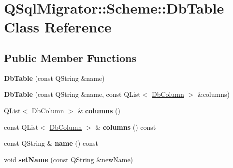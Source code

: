 \hypertarget{class_q_sql_migrator_1_1_scheme_1_1_db_table}{}\section{Q\+Sql\+Migrator\+:\+:Scheme\+:\+:Db\+Table Class Reference}
\label{class_q_sql_migrator_1_1_scheme_1_1_db_table}
\subsection*{Public Member Functions}
\begin{DoxyCompactItemize}
\item 
\mbox{\label{class_q_sql_migrator_1_1_scheme_1_1_db_table_aafe7fd03a4bd5ae26f578927b56d9baf}} 
{\bfseries Db\+Table} (const Q\+String \&name)
\item 
\mbox{\label{class_q_sql_migrator_1_1_scheme_1_1_db_table_a01333e5564fc51ab01d0817165cb6cd2}} 
{\bfseries Db\+Table} (const Q\+String \&name, const Q\+List$<$ \hyperlink{class_q_sql_migrator_1_1_scheme_1_1_db_column}{Db\+Column} $>$ \&columns)
\item 
\mbox{\label{class_q_sql_migrator_1_1_scheme_1_1_db_table_af5fc51b2a8ad10d03fb03f8a91efca5c}} 
Q\+List$<$ \hyperlink{class_q_sql_migrator_1_1_scheme_1_1_db_column}{Db\+Column} $>$ \& {\bfseries columns} ()
\item 
\mbox{\label{class_q_sql_migrator_1_1_scheme_1_1_db_table_a219b3cb406a48703456d3f7795ba8e6c}} 
const Q\+List$<$ \hyperlink{class_q_sql_migrator_1_1_scheme_1_1_db_column}{Db\+Column} $>$ \& {\bfseries columns} () const
\item 
\mbox{\label{class_q_sql_migrator_1_1_scheme_1_1_db_table_ac8a58d078563ba566d8762106564358f}} 
const Q\+String \& {\bfseries name} () const
\item 
\mbox{\label{class_q_sql_migrator_1_1_scheme_1_1_db_table_a1a6846104fb0038b6ab6c648f620c1d1}} 
void {\bfseries set\+Name} (const Q\+String \&new\+Name)

\end{DoxyCompactItemize}
